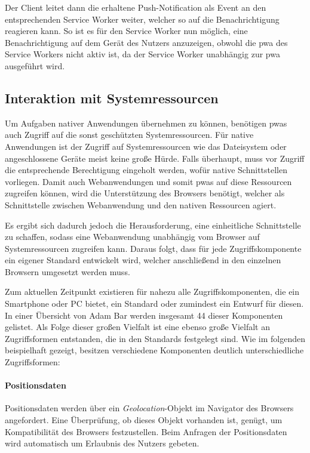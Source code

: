 \documentclass[12pt, parskip=half]{scrartcl}       %
\begin{document}
Der Client leitet dann die erhaltene Push-Notification als Event an den entsprechenden Service Worker weiter, welcher so auf die Benachrichtigung reagieren kann.
So ist es für den Service Worker nun möglich, eine Benachrichtigung auf dem Gerät des Nutzers anzuzeigen, obwohl die \ac{pwa} des Service Workers nicht aktiv ist, da der Service Worker unabhängig zur \ac{pwa} ausgeführt wird.


\subsection{Interaktion mit Systemressourcen}

Um Aufgaben nativer Anwendungen übernehmen zu können, benötigen \acp{pwa} auch Zugriff auf die sonst geschützten Systemressourcen.
Für native Anwendungen ist der Zugriff auf Systemressourcen wie das Dateisystem oder angeschlossene Geräte meist keine große Hürde.
Falls überhaupt, muss vor Zugriff die entsprechende Berechtigung eingeholt werden, wofür native Schnittstellen vorliegen.
Damit auch Webanwendungen und somit \acp{pwa} auf diese Ressourcen zugreifen können, wird die Unterstützung des Browsers benötigt, welcher als Schnittstelle zwischen Webanwendung und den nativen Ressourcen agiert.

Es ergibt sich dadurch jedoch die Herausforderung, eine einheitliche Schnittstelle zu schaffen, sodass eine Webanwendung unabhängig vom Browser auf Systemressourcen zugreifen kann.
Daraus folgt, dass für jede Zugriffskomponente ein eigener Standard entwickelt wird, welcher anschließend in den einzelnen Browsern umgesetzt werden muss.

Zum aktuellen Zeitpunkt existieren für nahezu alle Zugriffskomponenten, die ein Smartphone oder PC bietet, ein Standard oder zumindest ein Entwurf für diesen.
In einer Übersicht von Adam Bar\cite{bar_webcando} werden insgesamt 44 dieser Komponenten gelistet.
Als Folge dieser großen Vielfalt ist eine ebenso große Vielfalt an Zugriffsformen entstanden, die in den Standards festgelegt sind.
Wie im folgenden beispielhaft gezeigt, besitzen verschiedene Komponenten deutlich unterschiedliche Zugriffsformen:

\paragraph{Positionsdaten} Positionsdaten werden über ein \textit{Geolocation}-Objekt im Navigator des Browsers angefordert.
Eine Überprüfung, ob dieses Objekt vorhanden ist, genügt, um Kompatibilität des Browsers festzustellen.
Beim Anfragen der Positionsdaten wird automatisch um Erlaubnis des Nutzers gebeten\cite{w3c_geolocation}.
\end{document}
